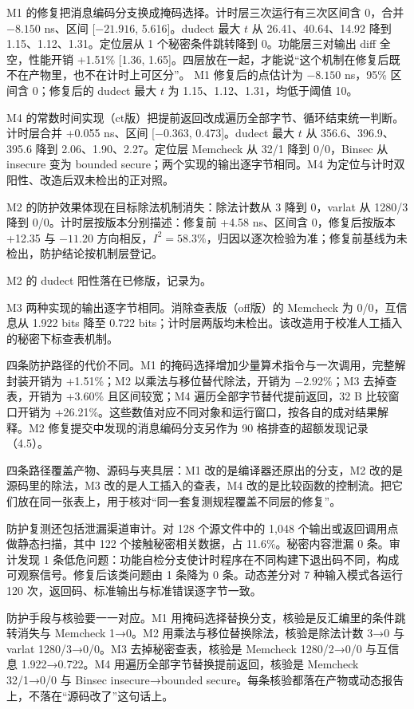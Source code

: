 M1 的修复把消息编码分支换成掩码选择。计时层三次运行有三次区间含 0，合并 $-8.150$ ns、区间 [$-21.916$, 5.616]。dudect 最大 $t$ 从 26.41、40.64、14.92 降到 1.15、1.12、1.31。定位层从 1 个秘密条件跳转降到 0。功能层三对输出 diff 全空，性能开销 +1.51\% [1.36, 1.65]。四层放在一起，才能说“这个机制在修复后既不在产物里，也不在计时上可区分”。
M1 修复后的点估计为 $-8.150$ ns，95\% 区间含 0；修复后的 dudect 最大 $t$ 为 1.15、1.12、1.31，均低于阈值 10。

M4 的常数时间实现（ct版）把提前返回改成遍历全部字节、循环结束统一判断。计时层合并 +0.055 ns、区间 [$-0.363$, 0.473]。dudect 最大 $t$ 从 356.6、396.9、395.6 降到 2.06、1.90、2.27。定位层 Memcheck 从 32/1 降到 0/0，Binsec 从 insecure 变为 bounded secure；两个实现的输出逐字节相同。M4 为定位与计时双阳性、改造后双未检出的正对照。

M2 的防护效果体现在目标除法机制消失：除法计数从 3 降到 0，varlat 从 1280/3 降到 0/0。计时层按版本分别描述：修复前 +4.58 ns、区间含 0，修复后按版本 +12.35 与 $-11.20$ 方向相反，$I^2=58.3\%$，归因以逐次检验为准；修复前基线为未检出，防护结论按机制层登记。

M2 的 dudect 阳性落在已修版，记录为。

M3 两种实现的输出逐字节相同。消除查表版（off版）的 Memcheck 为 0/0，互信息从 1.922 bits 降至 0.722 bits；计时层两版均未检出。该改造用于校准人工插入的秘密下标查表机制。

四条防护路径的代价不同。M1 的掩码选择增加少量算术指令与一次调用，完整解封装开销为 +1.51\%；M2 以乘法与移位替代除法，开销为 $-2.92\%$；M3 去掉查表，开销为 +3.60\% 且区间较宽；M4 遍历全部字节替代提前返回，32 B 比较窗口开销为 +26.21\%。这些数值对应不同对象和运行窗口，按各自的成对结果解释。M2 修复提交中发现的消息编码分支另作为 90 格排查的超额发现记录（4.5）。

四条路径覆盖产物、源码与夹具层：M1 改的是编译器还原出的分支，M2 改的是源码里的除法，M3 改的是人工插入的查表，M4 改的是比较函数的控制流。把它们放在同一张表上，用于核对“同一套复测规程覆盖不同层的修复”。

防护复测还包括泄漏渠道审计。对 128 个源文件中的 1,048 个输出或返回调用点做静态扫描，其中 122 个接触秘密相关数据，占 11.6\%。秘密内容泄漏 0 条。审计发现 1 条低危问题：功能自检分支使计时程序在不同构建下退出码不同，构成可观察信号。修复后该类问题由 1 条降为 0 条。动态差分对 7 种输入模式各运行 120 次，返回码、标准输出与标准错误逐字节一致。%

防护手段与核验要一一对应。M1 用掩码选择替换分支，核验是反汇编里的条件跳转消失与 Memcheck 1→0。M2 用乘法与移位替换除法，核验是除法计数 3→0 与 varlat 1280/3→0/0。M3 去掉秘密查表，核验是 Memcheck 1280/2→0/0 与互信息 1.922→0.722。M4 用遍历全部字节替换提前返回，核验是 Memcheck 32/1→0/0 与 Binsec insecure→bounded secure。每条核验都落在产物或动态报告上，不落在“源码改了”这句话上。

